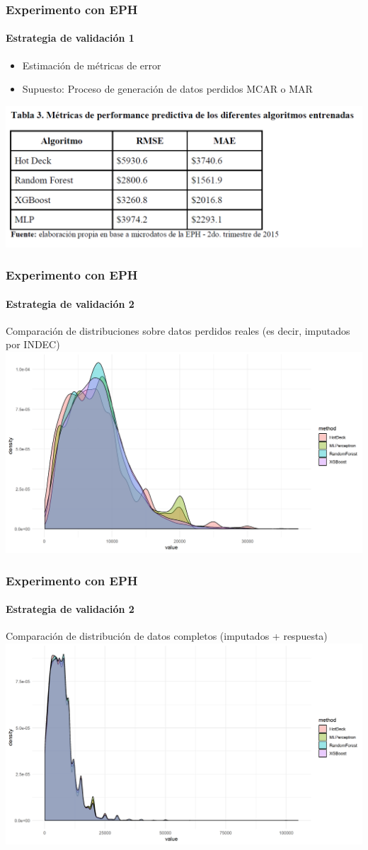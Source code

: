 \documentclass{beamer}
\begin{document}
\begin{frame}
\frametitle{Experimento con EPH}
\framesubtitle{Estrategia de validación 1}
\begin{itemize}
	\item Estimación de métricas de error
	\item Supuesto: Proceso de generación de datos perdidos MCAR o MAR
\end{itemize}
\includegraphics[width=0.85\linewidth, height=0.5\textheight]{../img/val1}
\end{frame}

\begin{frame}
\frametitle{Experimento con EPH}
\framesubtitle{Estrategia de validación 2}
Comparación de distribuciones sobre datos perdidos reales (es decir, imputados por INDEC)
\includegraphics[width=0.85\linewidth, height=0.7\textheight]{../img/density_imp}
\end{frame}

\begin{frame}
\frametitle{Experimento con EPH}
\framesubtitle{Estrategia de validación 2}
Comparación de distribución de datos completos (imputados + respuesta)
\includegraphics[width=0.85\linewidth, height=0.7\textheight]{../img/density_comp}
\end{frame}
\end{document}

